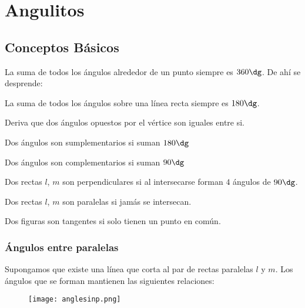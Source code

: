 \chapter{Angulitos}

\section{Conceptos Básicos}

La suma de todos los ángulos alrededor de un punto siempre es 
$360\dg$. De ahí se desprende:

La suma de todos los ángulos sobre una línea recta siempre es 
$180\dg$.

Deriva que dos ángulos opuestos por el vértice son iguales 
entre si.

\begin{definition}
    Dos ángulos son sumplementarios si suman $180\dg$
\end{definition}

\begin{definition}
    Dos ángulos son complementarios si suman $90\dg$
\end{definition}

\begin{definition}
    Dos rectas $l$, $m$ son perpendiculares si al intersecarse 
    forman $4$ ángulos de $90\dg$.
\end{definition}

\begin{definition}
    Dos rectas $l$, $m$ son paralelas si jamás se intersecan.
\end{definition}

\begin{definition}[Tangencia]
    Dos figuras son tangentes si solo tienen un punto en común.
\end{definition}


\subsection{Ángulos entre paralelas}

Supongamos que existe una línea que corta al par de rectas paralelas 
$l$ y $m$. Los ángulos que se forman mantienen las siguientes relaciones:

\begin{figure}[h]
    \centering
    \texttt{[image: anglesinp.png]}
\end{figure}


